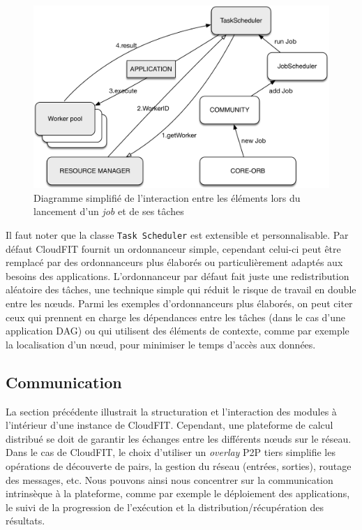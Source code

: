 \begin{figure}
	\centering
		\includegraphics[width=0.65\linewidth]{img/CloudFITstack-app}
		\caption{Diagramme simplifié de l'interaction entre les éléments lors du lancement d'un \textit{job} et de ses tâches}\label{Figure:applayer}
\end{figure}

Il faut noter que la classe \texttt{Task Scheduler} est extensible et personnalisable. Par défaut CloudFIT fournit un ordonnanceur simple, cependant celui-ci peut être remplacé par des ordonnanceurs plus élaborés ou particulièrement adaptés aux besoins des applications. L'ordonnanceur par défaut fait juste une redistribution aléatoire des tâches, une technique simple qui réduit le risque de travail en double entre les n{\oe}uds. Parmi les exemples d'ordonnanceurs plus élaborés, on peut citer ceux qui prennent en charge les dépendances entre les tâches (dans le cas d'une application DAG) ou qui utilisent des éléments de contexte, comme par exemple la localisation d'un n{\oe}ud, pour minimiser le temps d'accès aux données. 




\subsection{Communication\label{subsec:commCloudFIT}}

La section précédente illustrait la structuration et l'interaction des modules à l'intérieur d'une instance de CloudFIT. Cependant, une plateforme de calcul distribué se doit de garantir les échanges entre les différents n{\oe}uds sur le réseau. Dans le cas de CloudFIT, le choix d'utiliser un \textit{overlay} P2P tiers simplifie les opérations de découverte de pairs, la gestion du réseau (entrées, sorties), routage des messages, etc. Nous pouvons ainsi nous concentrer sur la communication intrinsèque à la plateforme, comme par exemple le déploiement des applications, le suivi de la progression de l'exécution et la distribution/récupération des résultats. 

